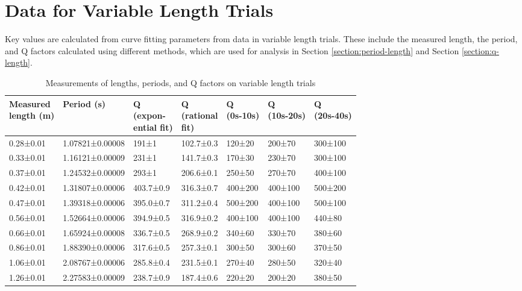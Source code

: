 \documentclass[12pt]{article}
\begin{document}
\section{Data for Variable Length Trials} \label{appendix:variable-length}

Key values are calculated from curve fitting parameters from data in variable length trials. These include the measured length, the period, and Q factors calculated using different methods, which are used for analysis in Section {\ref{section:period-length}} and Section {\ref{section:q-length}}.

\begin{table}[h]
\begin{tabularx}{\textwidth}{ |l|X|l|l|l|l|l| }
\hline
\makecell[l]{Measured\\length (m)} &
Period (s) &
\makecell[l]{Q\\(expon-\\ential fit)} &
\makecell[l]{Q\\(rational\\fit)} &
\makecell[l]{Q\\(0s-10s)} &
\makecell[l]{Q\\(10s-20s)} &
\makecell[l]{Q\\(20s-40s)}
\\ \hline
0.28±0.01 &
1.07821±0.00008 &
191±1 & 102.7±0.3 & 120±20 & 200±70 & 300±100
\\ \hline
0.33±0.01 &
1.16121±0.00009 &
231±1 & 141.7±0.3 & 170±30 & 230±70 & 300±100
\\ \hline
0.37±0.01 &
1.24532±0.00009 &
293±1 & 206.6±0.1 & 250±50 & 270±70 & 400±100
\\ \hline
0.42±0.01 &
1.31807±0.00006 &
403.7±0.9 & 316.3±0.7 & 400±200 & 400±100 & 500±200
\\ \hline
0.47±0.01 &
1.39318±0.00006 &
395.0±0.7 & 311.2±0.4 & 500±200 & 400±100 & 500±100
\\ \hline
0.56±0.01 &
1.52664±0.00006 &
394.9±0.5 & 316.9±0.2 & 400±100 & 400±100 & 440±80
\\ \hline
0.66±0.01 &
1.65924±0.00008 &
336.7±0.5 & 268.9±0.2 & 340±60 & 330±70 & 380±60
\\ \hline
0.86±0.01 &
1.88390±0.00006 &
317.6±0.5 & 257.3±0.1 & 300±50 & 300±60 & 370±50
\\ \hline
1.06±0.01 &
2.08767±0.00006 &
285.8±0.4 & 231.5±0.1 & 270±40 & 280±50 & 320±40
\\ \hline
1.26±0.01 &
2.27583±0.00009 &
238.7±0.9 & 187.4±0.6 & 220±20 & 200±20 & 380±50
\\ \hline
\end{tabularx}
\caption{Measurements of lengths, periods, and Q factors on variable length trials}
\label{table:variable-length}
\end{table}
\end{document}
